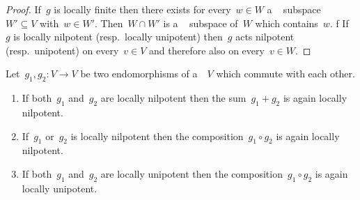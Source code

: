 \begin{proof}
  If~$g$ is locally finite then there exists for every~$w \in W$ a ~ subspace~$W' \subseteq V$ with~$w \in W'$.
  Then~$W \cap W'$ is a ~ subspace of~$W$ which contains~$w$.
  f 
  If~$g$ is locally nilpotent (resp.\ locally unipotent) then~$g$ acts nilpotent (resp.\ unipotent) on every~$v \in V$ and therefore also on every~$v \in W$.
\end{proof}


\begin{lemma}
  \label{combination of locally potent endomorphisms}
  Let~$g_1, g_2 \colon V \to V$ be two endomorphisms of a~~$V$ which commute with each other.
  \begin{enumerate}
    \item
      \label{sum of locally nilpotent}
      If both~$g_1$ and~$g_2$ are locally nilpotent then the sum~$g_1 + g_2$ is again locally nilpotent.
    \item
      \label{composition of locally nilpotent}
      If~$g_1$ or~$g_2$ is locally nilpotent then the composition~$g_1 \circ g_2$ is again locally nilpotent.
    \item
      \label{composition of locally uinpotent}
      If both~$g_1$ and~$g_2$ are locally unipotent then the composition~$g_1 \circ g_2$ is again locally unipotent.
  \end{enumerate}
\end{lemma}


